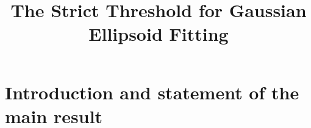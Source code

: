 \documentclass[11pt]{article}
\title[Strict Threshold for Gaussian Ellipsoid Fitting]{The Strict Threshold for Gaussian Ellipsoid Fitting}
\numberwithin{equation}{section}
\theoremstyle{definition}
\theoremstyle{remark}
\newcommand{\1}{\boldsymbol 1}
\begin{document}
\maketitle

\vspace{-0.5em}


\setcounter{tocdepth}{1} 
\tableofcontents


\vspace{2em}


\section{Introduction and statement of the main result} 
\end{document}
